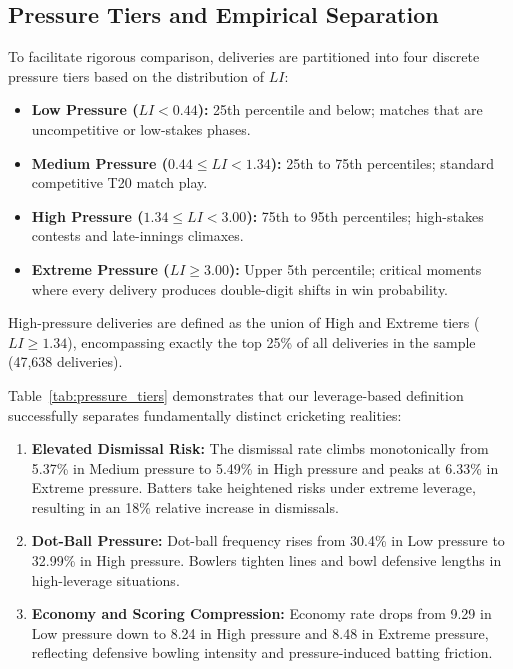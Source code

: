 \documentclass[11pt,a4paper]{article}
\begin{document}
\subsection{Pressure Tiers and Empirical Separation}
To facilitate rigorous comparison, deliveries are partitioned into four discrete pressure tiers based on the distribution of $LI$:
\begin{itemize}
    \item \textbf{Low Pressure ($LI < 0.44$):} 25th percentile and below; matches that are uncompetitive or low-stakes phases.
    \item \textbf{Medium Pressure ($0.44 \le LI < 1.34$):} 25th to 75th percentiles; standard competitive T20 match play.
    \item \textbf{High Pressure ($1.34 \le LI < 3.00$):} 75th to 95th percentiles; high-stakes contests and late-innings climaxes.
    \item \textbf{Extreme Pressure ($LI \ge 3.00$):} Upper 5th percentile; critical moments where every delivery produces double-digit shifts in win probability.
\end{itemize}
High-pressure deliveries are defined as the union of High and Extreme tiers ($LI \ge 1.34$), encompassing exactly the top 25\% of all deliveries in the sample (47,638 deliveries).



Table~\ref{tab:pressure_tiers} demonstrates that our leverage-based definition successfully separates fundamentally distinct cricketing realities:
\begin{enumerate}
    \item \textbf{Elevated Dismissal Risk:} The dismissal rate climbs monotonically from 5.37\% in Medium pressure to 5.49\% in High pressure and peaks at 6.33\% in Extreme pressure. Batters take heightened risks under extreme leverage, resulting in an 18\% relative increase in dismissals.
    \item \textbf{Dot-Ball Pressure:} Dot-ball frequency rises from 30.4\% in Low pressure to 32.99\% in High pressure. Bowlers tighten lines and bowl defensive lengths in high-leverage situations.
    \item \textbf{Economy and Scoring Compression:} Economy rate drops from 9.29 in Low pressure down to 8.24 in High pressure and 8.48 in Extreme pressure, reflecting defensive bowling intensity and pressure-induced batting friction.
\end{enumerate}
\end{document}
